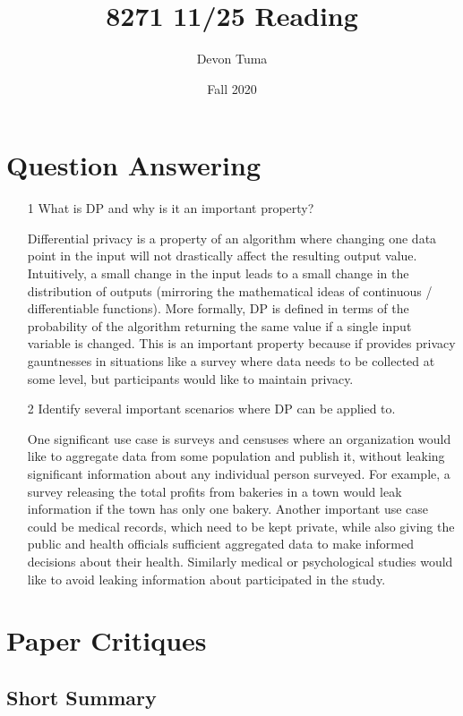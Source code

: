 \documentclass[11pt]{article}
\title{8271 11/25 Reading}
\author{Devon Tuma}
\date{Fall 2020}
\begin{document}
\maketitle

\section*{Question Answering}

\begin{itemize}
\item [1] What is DP and why is it an important property?

  Differential privacy is a property of an algorithm where changing one data point in the input will not drastically affect the resulting output value.
  Intuitively, a small change in the input leads to a small change in the distribution of outputs (mirroring the mathematical ideas of continuous / differentiable functions).
  More formally, DP is defined in terms of the probability of the algorithm returning the same value if a single input variable is changed.
  This is an important property because if provides privacy gauntnesses in situations like a survey where data needs to be collected at some level, but participants would like to maintain privacy.
  
\item [2] Identify several important scenarios where DP can be applied to.

  One significant use case is surveys and censuses where an organization would like to aggregate data from some population and publish it, without leaking significant information about any individual person surveyed.
  For example, a survey releasing the total profits from bakeries in a town would leak information if the town has only one bakery.
  Another important use case could be medical records, which need to be kept private, while also giving the public and health officials sufficient aggregated data to make informed decisions about their health.
  Similarly medical or psychological studies would like to avoid leaking information about participated in the study.

\end{itemize}

\section*{Paper Critiques}

\subsection*{Short Summary}
\end{document}
